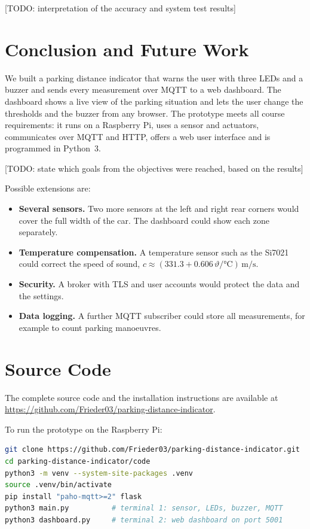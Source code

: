 \documentclass[11pt,a4paper]{article}
\newcommand{\todo}[1]{\textcolor{red!75!black}{[TODO: #1]}}
\newcommand{\repourl}{https://github.com/Frieder03/parking-distance-indicator}
\begin{document}
\todo{interpretation of the accuracy and system test results}

\section{Conclusion and Future Work}
\label{sec:conclusion}
We built a parking distance indicator that warns the user with three LEDs and a
buzzer and sends every measurement over MQTT to a web dashboard. The dashboard
shows a live view of the parking situation and lets the user change the
thresholds and the buzzer from any browser. The prototype meets all course
requirements: it runs on a Raspberry Pi, uses a sensor and actuators,
communicates over MQTT and HTTP, offers a web user interface and is programmed
in Python~3.

\todo{state which goals from the objectives were reached, based on the results}

Possible extensions are:
\begin{itemize}
  \item \textbf{Several sensors.} Two more sensors at the left and right rear
        corners would cover the full width of the car. The dashboard could show
        each zone separately.
  \item \textbf{Temperature compensation.} A temperature sensor such as the
        Si7021 could correct the speed of sound,
        $c \approx (331.3 + 0.606\,\vartheta/\unit{\celsius})\,\unit{\metre\per\second}$.
  \item \textbf{Security.} A broker with TLS and user accounts would protect the
        data and the settings.
  \item \textbf{Data logging.} A further MQTT subscriber could store all
        measurements, for example to count parking manoeuvres.
\end{itemize}

\printbibliography[heading=bibintoc]

\appendix
\section{Source Code}
\label{app:code}
The complete source code and the installation instructions are available at
\url{\repourl}.

To run the prototype on the Raspberry Pi:
\begin{lstlisting}[language=bash,numbers=none]
git clone https://github.com/Frieder03/parking-distance-indicator.git
cd parking-distance-indicator/code
python3 -m venv --system-site-packages .venv
source .venv/bin/activate
pip install "paho-mqtt>=2" flask
python3 main.py          # terminal 1: sensor, LEDs, buzzer, MQTT
python3 dashboard.py     # terminal 2: web dashboard on port 5001
\end{lstlisting}
\end{document}
